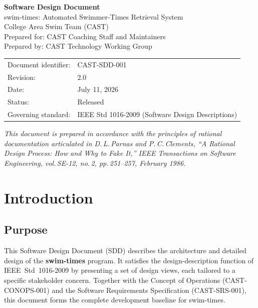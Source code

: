 \documentclass[12pt]{article}
\begin{document}
\begin{titlepage}
  \centering
  \vspace*{2cm}
  {\Huge\bfseries\color{castblue} Software Design Document\\[0.5em]}
  {\Large swim-times: Automated Swimmer-Times Retrieval System}\\[2em]
  {\large College Area Swim Team (CAST)}\\[0.5em]
  {\normalsize Prepared for: CAST Coaching Staff and Maintainers}\\[0.5em]
  {\normalsize Prepared by: CAST Technology Working Group}\\[2em]
  \begin{tabular}{ll}
    Document identifier: & CAST-SDD-001                                \\
    Revision:            & 2.0                                         \\
    Date:                & July 11, 2026                               \\
    Status:              & Released                                    \\
    Governing standard:  & IEEE Std 1016-2009 (Software Design Descriptions) \\
  \end{tabular}
  \vfill
  {\small\textit{This document is prepared in accordance with the principles
  of rational documentation articulated in D.\,L.\,Parnas and P.\,C.\,Clements,
  ``A Rational Design Process: How and Why to Fake It,''
  \textit{IEEE Transactions on Software Engineering}, vol.\,SE-12, no.\,2,
  pp.\,251--257, February 1986.}}
\end{titlepage}

\tableofcontents
\clearpage

\section{Introduction}

\subsection{Purpose}

This Software Design Document (SDD) describes the architecture
and detailed design of the \textbf{swim-times} program.  It
satisfies the design-description function of IEEE~Std~1016-2009
by presenting a set of design views, each tailored to a specific
stakeholder concern.  Together with the Concept of Operations
(CAST-CONOPS-001) and the Software Requirements Specification
(CAST-SRS-001), this document forms the complete development
baseline for swim-times.
\end{document}
